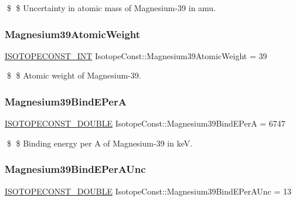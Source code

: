 \$ \$ Uncertainty in atomic mass of Magnesium-\/39 in amu. \mbox{\label{group___isotope_const-_magnesium-_mg39_ga85b6a0e7c0615e2a0973265661142660}} 
\subsubsection{\texorpdfstring{Magnesium39\+Atomic\+Weight}{Magnesium39AtomicWeight}}
{\footnotesize\ttfamily \mbox{\hyperlink{group___isotope_const-_macros_ga5f18360b3e99483a35c32d789e62621c}{I\+S\+O\+T\+O\+P\+E\+C\+O\+N\+S\+T\+\_\+\+I\+NT}} Isotope\+Const\+::\+Magnesium39\+Atomic\+Weight = 39}

\$ \$ Atomic weight of Magnesium-\/39. \mbox{\label{group___isotope_const-_magnesium-_mg39_ga2ec4aecc736f1cb85f1fa20f48a15331}} 
\subsubsection{\texorpdfstring{Magnesium39\+Bind\+E\+PerA}{Magnesium39BindEPerA}}
{\footnotesize\ttfamily \mbox{\hyperlink{group___isotope_const-_macros_ga8f45a7272ce02c0b4c65c44636ed719a}{I\+S\+O\+T\+O\+P\+E\+C\+O\+N\+S\+T\+\_\+\+D\+O\+U\+B\+LE}} Isotope\+Const\+::\+Magnesium39\+Bind\+E\+PerA = 6747}

\$ \$ Binding energy per A of Magnesium-\/39 in keV. \mbox{\label{group___isotope_const-_magnesium-_mg39_ga859471a6eb4351041543ca10057c6421}} 
\subsubsection{\texorpdfstring{Magnesium39\+Bind\+E\+Per\+A\+Unc}{Magnesium39BindEPerAUnc}}
{\footnotesize\ttfamily \mbox{\hyperlink{group___isotope_const-_macros_ga8f45a7272ce02c0b4c65c44636ed719a}{I\+S\+O\+T\+O\+P\+E\+C\+O\+N\+S\+T\+\_\+\+D\+O\+U\+B\+LE}} Isotope\+Const\+::\+Magnesium39\+Bind\+E\+Per\+A\+Unc = 13}


